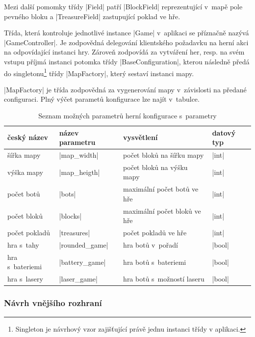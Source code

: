 Mezi další pomomky třídy \ic|Field| patří \ic|BlockField| reprezentující v~mapě pole pevného bloku a \ic|TreasureField| zastupující poklad ve hře.

Třída, která kontroluje jednotlivé instance \ic|Game| v~aplikaci se příznačně nazývá \ic|GameController|. Je zodpovědná delegování klientského požadavku na herní akci na odpovídající instanci hry. Zároveň zodpovídá za vytváření her, resp. na svém vstupu příjmá instanci potomka třídy \ic|BaseConfiguration|, kterou následně předá do singletonu\footnote{Singleton je návrhový vzor zajišťující právě jednu instanci třídy v aplikaci.} třídy \ic|MapFactory|, který sestaví instanci mapy.

\ic|MapFactory| je třída zodpovědná za vygenerování mapy v~závislosti na předané configuraci. Plný výčet parametů konfigurace lze najít v~tabulce.

\begin{table}[H]
	\caption{Seznam možných parametrů herní konfigurace s~parametry}
	\label{table:conf-parameters}
	\centering
	\begin{tabular}{ l | l | l | l }
		český název & název parametru & vysvětlení & datový typ \\
		\hline
		šířka mapy & \ic|map_width| & počet bloků na šířku mapy & \ic|int| \\
		výška mapy & \ic|map_heigth| & počet bloků na výšku mapy & \ic|int| \\
		počet botů & \ic|bots| & maximální počet botů ve hře & \ic|int| \\
		počet bloků & \ic|blocks| & maximální počet bloků ve hře & \ic|int| \\
		počet pokladů & \ic|treasures| & počet pokladů ve hře & \ic|int| \\
		hra s~tahy & \ic|rounded_game| & hra botů v~pořadí & \ic|bool| \\
		hra s~bateriemi & \ic|battery_game| & hra botů s~bateriemi & \ic|bool| \\
		hra s~lasery & \ic|laser_game| & hra botů s~možností laseru & \ic|bool| \\
	\end{tabular}
\end{table}

\subsubsection{Návrh vnějšího rozhraní}


